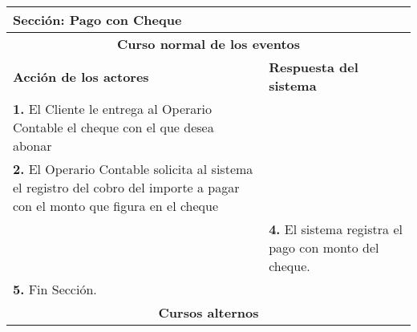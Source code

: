 \documentclass[12pt]{extarticle}
\begin{document}
    \begin{longtable}{ |p{8cm}|p{8cm}| }
        \hline
        \multicolumn{2}{|p{16cm}|}{\textbf{Sección}: Pago con Cheque}\\
        \hline
        \multicolumn{2}{|c|}{\textbf{Curso normal de los eventos}}\\
        \hline
        \textbf{Acción de los actores} & \textbf{Respuesta del sistema}\\
            \hline
            \textbf{1. } El Cliente le entrega al Operario Contable el cheque con el que desea abonar & \\
            \hline
            \textbf{2. } El Operario Contable solicita al sistema el registro del cobro del importe a pagar con el monto que figura en el cheque &  \\
            \hline
            & \textbf{4. }El sistema registra el pago con monto del cheque. \\
            \hline
            \textbf{5. }Fin Sección. & \\
            \hline
        \multicolumn{2}{|c|}{\textbf{Cursos alternos}}\\
        \hline
    \end{longtable}
\end{document}
